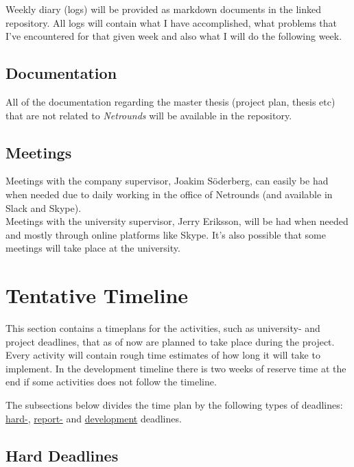 \documentclass[10pt, titlepage, oneside, a4paper]{article}
\def\netrounds_supervisor{Joakim Söderberg}
\def\uni_supervisor{Jerry Eriksson}
\begin{document}
Weekly diary (logs) will be provided as markdown documents in the linked repository. All logs will contain what I have accomplished, what problems that I've encountered for that given week and also what I will do the following week.

\subsection{Documentation}

All of the documentation regarding the master thesis (project plan, thesis etc) that are not related to \textit{Netrounds} will be available in the repository. 

\subsection{Meetings}

Meetings with the company supervisor, \netrounds_supervisor, can easily be had when needed due to daily working in the office of Netrounds (and available in Slack and Skype).\\ 

Meetings with the university supervisor, \uni_supervisor, will be had when needed and mostly through online platforms like Skype. It's also possible that some meetings will take place at the university.



\section{Tentative Timeline}

This section contains a timeplans for the activities, such as university- and project deadlines, that as of now are planned to take place during the project. Every activity will contain rough time estimates of how long it will take to implement. In the development timeline there is two weeks of reserve time at the end if some activities does not follow the timeline.

The subsections below divides the time plan by the following types of deadlines: \underline{hard-}, \underline{report-} and
\underline{development} deadlines.



\subsection{Hard Deadlines}
\end{document}
